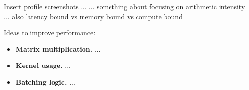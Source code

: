 \documentclass[12pt,letterpaper,twoside]{article}
\begin{document}
Insert profile screenshots ...
... something about focusing on arithmetic intensity
... also latency bound vs memory bound vs compute bound


Ideas to improve performance:
\begin{itemize}
    \item \textbf{Matrix multiplication.} ...

    \item \textbf{Kernel usage.} ...

    \item \textbf{Batching logic.} ... 

\end{itemize}
\end{document}

